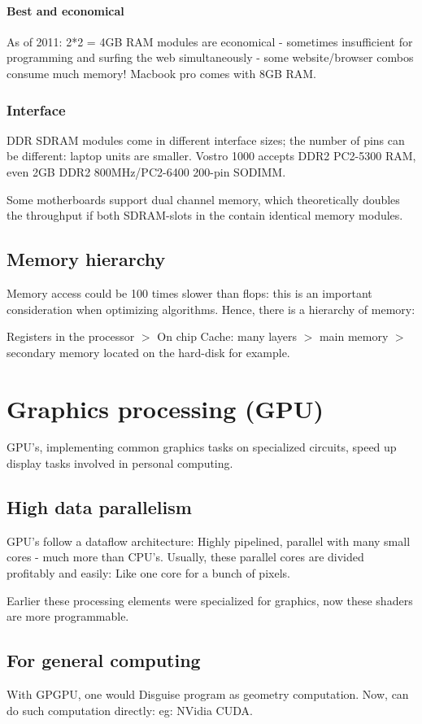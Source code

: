 \documentclass[oneside, article]{memoir}
\begin{document}
\paragraph{Best and economical}
As of 2011: 2*2 = 4GB RAM modules are economical - sometimes insufficient for programming and surfing the web simultaneously - some website/browser combos consume much memory! Macbook pro comes with 8GB RAM.

\subsubsection{Interface}
DDR SDRAM modules come in different interface sizes; the number  of pins can be different: laptop units are smaller. Vostro 1000 accepts DDR2 PC2-5300 RAM, even 2GB DDR2 800MHz/PC2-6400 200-pin SODIMM.

Some motherboards support dual channel memory, which theoretically doubles the throughput if both SDRAM-slots in the contain identical memory modules.

\subsection{Memory hierarchy}
Memory access could be 100 times slower than flops: this is an important consideration when optimizing algorithms. Hence, there is a hierarchy of memory:

Registers in the processor $>$ On chip Cache: many layers $>$ main memory $>$ secondary memory located on the hard-disk for example.

\section{Graphics processing (GPU)}
GPU's, implementing common graphics tasks on specialized circuits, speed up display tasks involved in personal computing.

\subsection{High data parallelism}
GPU's follow a dataflow architecture: Highly pipelined, parallel with many small cores - much more than CPU's. Usually, these parallel cores are divided profitably and easily: Like one core for a bunch of pixels.

Earlier these processing elements were specialized for graphics, now these shaders are more programmable.

\subsection{For general computing}
With GPGPU, one would Disguise program as geometry computation. Now, can do such computation directly: eg: NVidia CUDA.
\end{document}
